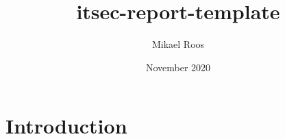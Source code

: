 \documentclass{article}
\title{itsec-report-template}
\author{Mikael Roos}
\date{November 2020}
\begin{document}
\maketitle

\section{Introduction}
\end{document}
